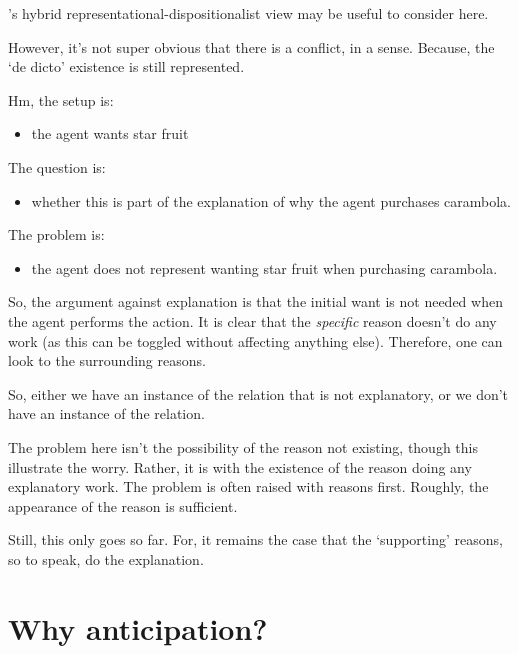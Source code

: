 \documentclass[10pt]{article}
\begin{document}
\citeauthor{Neta:2019aa}'s hybrid representational-dispositionalist view may be useful to consider here.

However, it's not super obvious that there is a conflict, in a sense.
Because, the `de dicto' existence is still represented.

Hm, the setup is:
\begin{itemize}
\item the agent wants star fruit
\end{itemize}
The question is:
\begin{itemize}
\item whether this is part of the explanation of why the agent purchases carambola.
\end{itemize}
The problem is:
\begin{itemize}
\item the agent does not represent wanting star fruit when purchasing carambola.
\end{itemize}

So, the argument against explanation is that the initial want is not needed when the agent performs the action.
It is clear that the \emph{specific} reason doesn't do any work (as this can be toggled without affecting anything else).
Therefore, one can look to the surrounding reasons.

So, either we have an instance of the relation that is not explanatory, or we don't have an instance of the relation.

{\color{red}
  The problem here isn't the possibility of the reason not existing, though this illustrate the worry.
  Rather, it is with the existence of the reason doing any explanatory work.
}
The problem is often raised with reasons first.
Roughly, the appearance of the reason is sufficient.

Still, this only goes so far.
For, it remains the case that the `supporting' reasons, so to speak, do the explanation.


\section{Why anticipation?}
\label{sec:why-anticipation}
\end{document}
